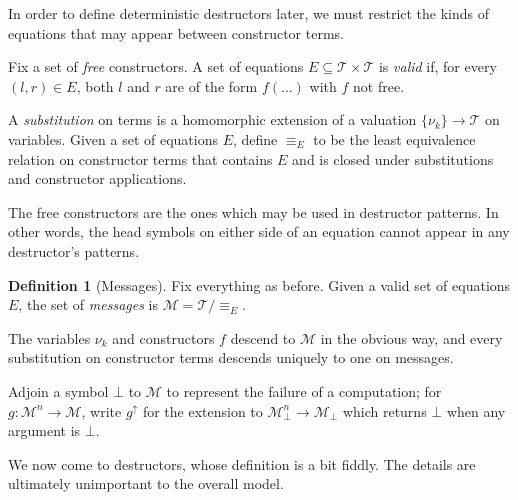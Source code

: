 \documentclass[11pt]{article}
\theoremstyle{definition}
\newtheorem{definition}{Definition}[section]
\theoremstyle{plain}
\theoremstyle{remark}
\begin{document}
In order to define deterministic destructors later, we must restrict the kinds of equations that may appear between constructor terms.

Fix a set of \textit{free} constructors. A set of equations $E\subseteq\mathcal{T}\times\mathcal{T}$ is \textit{valid} if, for every $(l,r)\in E$, both $l$ and $r$ are of the form $f(\dots)$ with $f$ not free.

A \textit{substitution} on terms is a homomorphic extension of a valuation $\{\nu_k\}\to\mathcal{T}$ on variables. Given a set of equations $E$, define $\equiv_{E}$ to be the least equivalence relation on constructor terms that contains $E$ and is closed under substitutions and constructor applications.

The free constructors are the ones which may be used in destructor patterns. In other words, the head symbols on either side of an equation cannot appear in any destructor's patterns.

\begin{definition}[Messages]
    Fix everything as before. Given a valid set of equations $E$, the set of \textit{messages} is $\mathcal{M}=\mathcal{T}/{\equiv_{E}}$.
\end{definition}

The variables $\nu_k$ and constructors $f$ descend to $\mathcal{M}$ in the obvious way, and every substitution on constructor terms descends uniquely to one on messages.

Adjoin a symbol $\bot$ to $\mathcal{M}$ to represent the failure of a computation; for $g:\mathcal{M}^n\to\mathcal{M}$, write $g^{\uparrow}$ for the extension to $\mathcal{M}_{\bot}^n\to\mathcal{M}_\bot$ which returns $\bot$ when any argument is $\bot$.

We now come to destructors, whose definition is a bit fiddly. The details are ultimately unimportant to the overall model.
\end{document}
